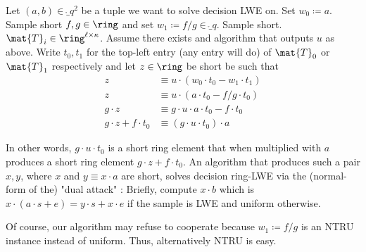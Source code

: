 Let \((a,b) \in \ring_{q}^{2}\)  be a tuple we want to solve decision LWE on. Set \(w_{0} \coloneqq a\). Sample short \(f,g \in \ring\) and set \(w_{1} \coloneqq  f/g \in \ring_{q}\). Sample short. \(\mat{T}_{i} \in \ring^{\ell \times \kappa}\). Assume there exists and algorithm that outputs \(u\) as above. Write \(t_{0},t_{1}\) for the top-left entry (any entry will do) of \(\mat{T}_{0}\) or \(\mat{T}_{1}\) respectively and let \(z \in \ring\) be short be such that
\begin{align*}
z &\equiv u \cdot (w_{0} \cdot t_{0} -  w_{1} \cdot t_{1})\\
z &\equiv u \cdot (a \cdot t_{0} -  f/g \cdot t_0)\\
g \cdot z &\equiv g \cdot u \cdot a \cdot t_{0} -  f \cdot t_0\\
g \cdot z + f \cdot t_0 &\equiv (g \cdot u \cdot t_{0}) \cdot a
\end{align*}

In other words, \(g \cdot u \cdot t_{0}\) is a short ring element that when multiplied with \(a\) produces a short ring element \(g \cdot z + f \cdot t_0\). An algorithm that produces such a pair \(x,y\), where \(x\) and \(y \equiv x \cdot a\) are short, solves decision ring-LWE via the (normal-form of the) "dual attack" \cite{USENIX:ADPS16,EC:Albrecht17}: Briefly, compute \(x \cdot b\) which is \(x \cdot (a \cdot s + e) = y\cdot s + x\cdot e\) if the sample is LWE and uniform otherwise.

Of course, our algorithm may refuse to cooperate because \(w_{1} \coloneqq  f/g\) is an NTRU instance instead of uniform. Thus, alternatively NTRU is easy.


